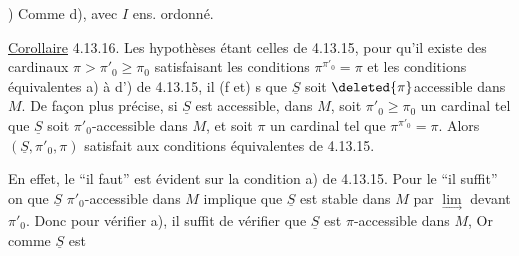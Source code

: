 
) Comme d), avec $I$ ens. ordonné.

\uline{Corollaire} 4.13.16. Les hypothèses  étant celles de 4.13.15, pour qu'il existe des cardinaux $\pi>\pi'_0\geq\pi_0$ satisfaisant les conditions $\pi^{\pi'_0}=\pi$  et les conditions équivalentes a) à d') de 4.13.15, il (f et) s que $\underline S$ soit $\deleted{\pi}$accessible dans $M$. De façon plus précise,  si $\underline S$ est accessible, dans $M$, soit $\pi'_0\geq\pi_0$ un cardinal tel que $\underline S$ soit $\pi'_0$-accessible dans $M$, et soit $\pi$ un cardinal  tel que $\pi^{\pi'_0}=\pi$. Alors $(\underline S,\pi'_0,\pi)$ satisfait aux conditions équivalentes de 4.13.15.

En effet, le ``il faut'' est évident sur la condition a) de 4.13.15. Pour le ``il suffit'' on  que $\underline S$ $\pi'_0$-accessible dans $M$ implique que $\underline S$ est stable dans $M$ par $\underset{\longrightarrow}{\lim}$  devant $\pi'_0$. Donc pour vérifier a), il suffit de vérifier que $\underline S$ est $\pi$-accessible dans $M$, Or comme $\underline S$ est


